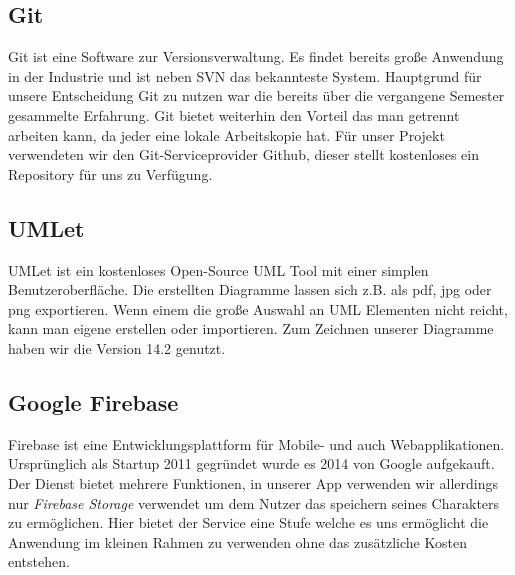 \subsection{Git}

Git ist eine Software zur Versionsverwaltung. Es findet bereits große Anwendung in der Industrie und ist neben SVN das bekannteste System. Hauptgrund für unsere Entscheidung Git zu nutzen war die bereits über die vergangene Semester gesammelte Erfahrung. Git bietet weiterhin den Vorteil das man getrennt arbeiten kann, da jeder eine lokale Arbeitskopie hat. Für unser Projekt verwendeten wir den Git-Serviceprovider Github, dieser stellt kostenloses ein Repository für uns zu Verfügung.

\subsection{UMLet}

UMLet ist ein kostenloses Open-Source UML Tool mit einer simplen Benutzeroberfläche. Die erstellten Diagramme lassen sich z.B. als pdf, jpg oder png exportieren. Wenn einem die große Auswahl an UML Elementen nicht reicht, kann man eigene erstellen oder importieren. Zum Zeichnen unserer Diagramme haben wir die Version 14.2 genutzt.\cite{umlet}

\subsection{Google Firebase}
\label{sdt:firebase}

Firebase ist eine Entwicklungsplattform für Mobile- und auch Webapplikationen. Ursprünglich als Startup 2011 gegründet wurde es 2014 von Google aufgekauft. Der Dienst bietet mehrere Funktionen, in unserer App verwenden wir allerdings nur \textit{Firebase Storage} verwendet um dem Nutzer das speichern seines Charakters zu ermöglichen. Hier bietet der Service eine Stufe welche es uns ermöglicht die Anwendung im kleinen Rahmen zu verwenden ohne das zusätzliche Kosten entstehen.

\newpage
